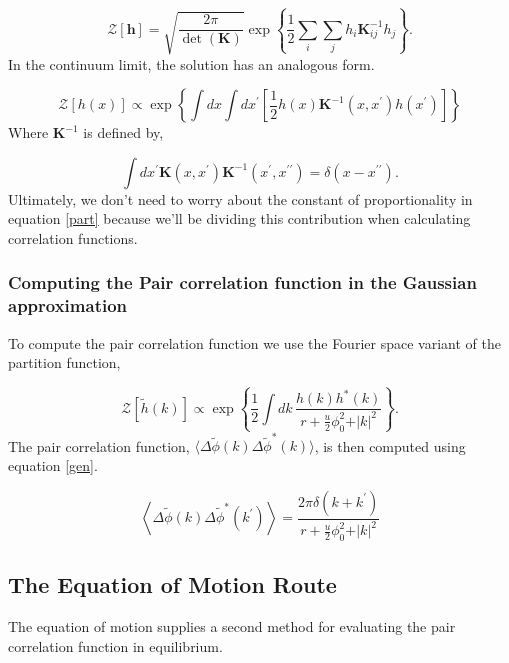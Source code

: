 \documentclass[11pt]{article}
\newcommand{\f}{\frac}
\newcommand{\Z}{\mathcal{Z}}
\newcommand{\fphi}{\tilde{\phi}}
\renewcommand{\l}{\left}
\renewcommand{\r}{\right}
\begin{document}
\begin{equation}
\Z[\mathbf{h}] = \sqrt{\f{2\pi}{\det(\mathbf{K})}} \exp\left\lbrace \f{1}{2} \sum_i \sum_j h_i \mathbf{K}_{ij}^{-1} h_j\right\rbrace.
\end{equation}
In the continuum limit, the solution has an analogous form. 

\begin{equation}\label{part}
\Z[h(x)] \propto \exp\left\lbrace \int dx \int dx^\prime \left[ \f{1}{2}h(x) \mathbf{K}^{-1}(x, x^\prime) h(x^\prime)\right] \right\rbrace
\end{equation}
Where $\mathbf{K}^{-1}$ is defined by, 

\begin{equation}
\int dx^\prime \mathbf{K}(x, x^\prime)\mathbf{K}^{-1}(x^\prime, x^{\prime\prime}) = \delta(x - x^{\prime\prime}).
\end{equation}
Ultimately, we don't need to worry about the constant of proportionality in equation \ref{part} because we'll be dividing this contribution when calculating correlation functions. 

\subsubsection{Computing the Pair correlation function in the Gaussian approximation}

To compute the pair correlation function we use the Fourier space variant of the partition function, 

\begin{equation}
\Z[\tilde{h}(k)] \propto \exp\left\lbrace \f{1}{2}\int dk\,\f{h(k)h^{*}(k)}{r + \f{u}{2}\phi_0^2 +  \vert k \vert^2}\right\rbrace.
\end{equation}
The pair correlation function, $\langle \Delta\tilde{\phi}(k)\Delta\tilde{\phi}^{*}(k)\rangle$, is then computed using equation \ref{gen}.

\begin{equation}
\l\langle \Delta\fphi(k)\Delta\fphi^{*}(k^\prime) \r\rangle = \f{2\pi \delta(k+k^\prime)}{r + \f{u}{2}\phi_0^2 + \vert k \vert^2} 
\end{equation}

\subsection{The Equation of Motion Route}

The equation of motion supplies a second method for evaluating the pair correlation function in equilibrium. 
\end{document}
